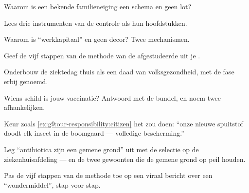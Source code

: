 \begin{exercise}[$\star$]\label{exo:g9:our-responsibility:3}
Waarom is een bekende familieneiging een schema en geen
lot?
\end{exercise}

\begin{exercise}[$\star$]\label{exo:g9:our-responsibility:4}
Lees drie instrumenten van de controle als hun hoofdstukken.
\end{exercise}

\begin{exercise}[$\star$]\label{exo:g9:our-responsibility:5}
Waarom is  ``werkkapitaal'' en geen decor? Twee
mechanismen.
\end{exercise}

\begin{exercise}[$\star$]\label{exo:g9:our-responsibility:6}
Geef de vijf stappen van de methode van de afgestudeerde uit je .
\end{exercise}

\begin{exercise}[$\star\star$]\label{exo:g9:our-responsibility:7}
Onderbouw de ziektedag thuis als een daad van volksgezondheid, met
de fase erbij genoemd.
\end{exercise}

\begin{exercise}[$\star\star$]\label{exo:g9:our-responsibility:8}
Wiens schild is jouw vaccinatie? Antwoord met de bundel, en noem
twee afhankelijken.
\end{exercise}

\begin{exercise}[$\star\star$]\label{exo:g9:our-responsibility:9}
Keur zoals \cref{ex:g9:our-responsibility:citizen} het zou doen:
``onze nieuwe spuitstof doodt elk insect in de boomgaard ---
volledige bescherming.''
\end{exercise}

\begin{exercise}[$\star\star$]\label{exo:g9:our-responsibility:10}
Leg ``antibiotica zijn een gemene grond'' uit met de selectie op de
ziekenhuisafdeling --- en de twee gewoonten die de gemene grond op
peil houden.
\end{exercise}

\begin{exercise}[$\star\star$]\label{exo:g9:our-responsibility:11}
Pas de vijf stappen van de methode toe op een viraal bericht over
een ``wondermiddel'', stap voor stap.
\end{exercise}

